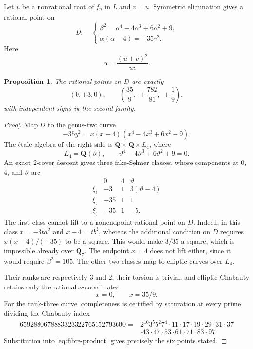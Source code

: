 \documentclass[11pt]{article}
\newcommand{\Q}{\mathbf Q}
\newtheorem{proposition}[theorem]{Proposition}
\theoremstyle{definition}
\theoremstyle{remark}
\begin{document}
Let $u$ be a nonrational root of $f_\eta$ in $L$ and $v=\bar u$.  Symmetric
elimination gives a rational point on
\begin{equation}\label{eq:fibre-product}
 D:\quad
 \begin{cases}
 \beta^2=\alpha^4-4\alpha^3+6\alpha^2+9,\\
 \alpha(\alpha-4)=-35\gamma^2.
 \end{cases}
\end{equation}
Here
\[
                    \alpha=\frac{(u+v)^2}{uv}.
\]

\begin{proposition}\label{prop:six-points}
The rational points on $D$ are exactly
\[
 (0,\pm3,0),\qquad
 \left(\frac{35}{9},\ \pm\frac{782}{81},\ \pm\frac19\right),
\]
with independent signs in the second family.
\end{proposition}

\begin{proof}
Map $D$ to the genus-two curve
\begin{equation}\label{eq:quadratic-genus2}
 -35y^2=x(x-4)(x^4-4x^3+6x^2+9).
\end{equation}
The \'etale algebra of the right side is
$\Q\times\Q\times L_4$, where
\[
 L_4=\Q(\vartheta),\qquad
 \vartheta^4-4\vartheta^3+6\vartheta^2+9=0.
\]
An exact $2$-cover descent \cite{BruinStollDescent} gives three
fake-Selmer classes, whose components
at $0$, $4$, and $\vartheta$ are
\[
\begin{array}{c|ccc}
 &0&4&\vartheta\\ \hline
 \xi_1&-3&1&3(\vartheta-4)\\
 \xi_2&-35&1&1\\
 \xi_3&-35&1&-5.
\end{array}
\]
The first class cannot lift to a nonendpoint rational point on $D$.
Indeed, in this class $x=-3ta^2$ and $x-4=tb^2$, whereas the additional
condition on $D$ requires $x(x-4)/(-35)$ to be a square.  This would make
$3/35$ a square, which is impossible already over $\Q_7$.  The endpoint
$x=4$ does not lift either, since it would require $\beta^2=105$.
The other two classes map to elliptic curves over $L_4$.

Their
ranks are respectively $3$ and $2$, their torsion is trivial, and elliptic
Chabauty \cite{BruinEC} retains only the rational $x$-coordinates
\[
                               x=0,\qquad x=35/9.
\]
For the rank-three curve, completeness is certified by saturation at every
prime dividing the Chabauty index
\[
\begin{split}
6592880678883323322765152793600
={}&2^{10}3^5 5^2 7^4\cdot11\cdot17\cdot19\cdot29\cdot31\cdot37\\
 &\cdot43\cdot47\cdot53\cdot61\cdot71\cdot83\cdot97.
\end{split}
\]
Substitution into \eqref{eq:fibre-product} gives precisely the six points
stated.
\end{proof}
\end{document}
